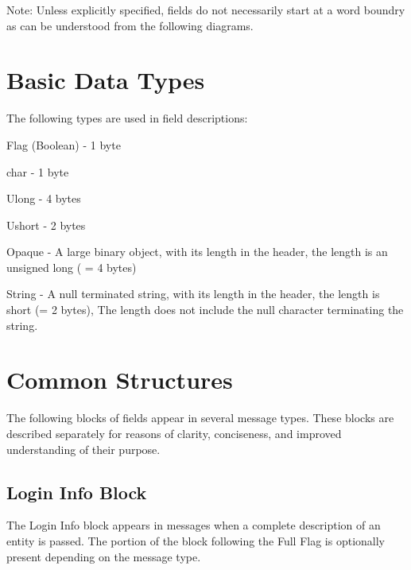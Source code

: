 \documentclass[titlepage,oneside]{book}
\begin{document}
\par{} Note: Unless explicitly specified, fields do not necessarily
start at a word boundry as can be understood from the following
diagrams.

\section{Basic Data Types}

\par{} The following types are used in field descriptions:

\par{} Flag (Boolean) - 1 byte
\par{} char           - 1 byte
\par{} Ulong          - 4 bytes
\par{} Ushort         - 2 bytes
\par{} Opaque         - A large binary object, with its length in the header,
                 the length is an unsigned long ( = 4 bytes)
\par{} String         - A null terminated string, with its length in the
                 header, the length is short (= 2 bytes), The length
                 does not include the null character terminating the
                 string.

\section{Common Structures}

\par{} The following blocks of fields appear in several message
types. These blocks are described separately for reasons of clarity,
conciseness, and improved understanding of their purpose.

\subsection{Login Info Block}

\par{} The Login Info block appears in messages when a complete
description of an entity is passed. The portion of the block following
the Full Flag is optionally present depending on the message type.
\end{document}
